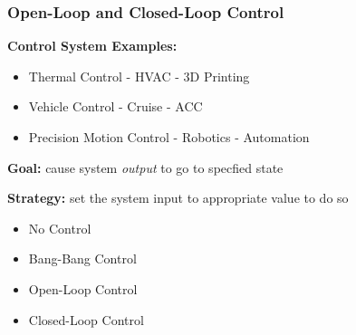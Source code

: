 \documentclass[fleqn]{beamer} %
\newcommand{\sectionIsubsectionItitle}{Open-Loop and Closed-Loop Control}
\begin{document}
			\begin{frame} \small
				\frametitle{\sectionIsubsectionItitle} 
				\bigskip

				\textbf{Control System Examples:}
                \begin{itemize}

                    \item Thermal Control - HVAC - 3D Printing
                    \item Vehicle Control - Cruise - ACC
                    \item Precision Motion Control - Robotics - Automation  

                \end{itemize}                   

                \vspace*{5mm}
                \textbf{Goal:} cause system {\it output} to go to specfied state

                \vspace*{5mm}
                \textbf{Strategy:} set the system input to appropriate value to do so
                \begin{itemize}
                	\item No Control 
                	\item Bang-Bang Control
                	\item Open-Loop Control
                	\item Closed-Loop Control
                \end{itemize}

				\btVFill
			\end{frame}
\end{document}
